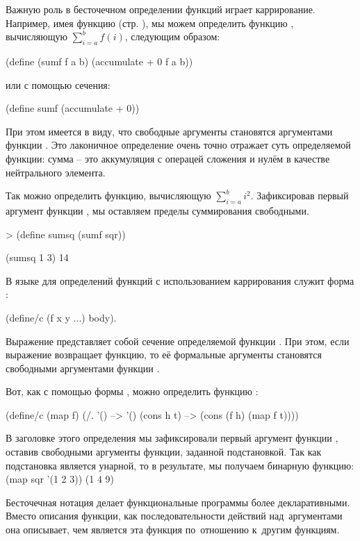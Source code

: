 Важную роль в бесточечном определении функций играет каррирование. Например, имея функцию  (стр. \pageref{accumulate}), мы можем определить функцию , вычисляющую $\sum_{i=a}^b f(i)$,  следующим образом:
\begin{SchemeCode}[emph={f,a,b}]
  (define (sumf f a b) (accumulate + 0 f a b))
\end{SchemeCode}
или с помощью сечения:
\begin{SchemeCode}
  (define sumf (accumulate + 0))
\end{SchemeCode}
При этом имеется в виду, что свободные аргументы  становятся аргументами функции . Это лаконичное определение очень точно отражает суть определяемой функции: сумма -- это аккумуляция с операцей сложения и нулём в качестве нейтрального элемента.

Так можно определить функцию, вычисляющую $\sum_{i=a}^b i^2$. Зафиксировав первый аргумент функции , мы оставляем пределы суммирования свободными.
\begin{SchemeCode}
   > (define sumsq (sumf sqr))
\end{SchemeCode}
\REPL
  {(sumsq 1 3)}
  {14} 

В языке \Scheme для определений функций с использованием каррирования служит форма :\label{define-c} 
\begin{SchemeCode}
(define/c (f x y ...) body).
\end{SchemeCode}
Выражение  представляет собой сечение определяемой функции . При этом, если выражение  возвращает функцию, то её формальные аргументы становятся свободными аргументами функции .

Вот, как с помощью формы , можно определить функцию :
\begin{SchemeCode}[emph={f,h,t}]
(define/c (map f)
  (/. '() --> '()
      (cons h t) --> (cons (f h) (map f t))))
\end{SchemeCode}
В заголовке этого определения мы зафиксировали первый аргумент функции , оставив свободными аргументы функции, заданной подстановкой. Так как подстановка является унарной, то в результате, мы получаем бинарную функцию:
\REPL
  {(map sqr '(1 2 3))}
  {(1 4 9)} 

Бесточечная нотация делает функциональные программы более декларативными. Вместо описания функции, как последовательности действий над~аргументами она описывает, чем является эта функция по~отношению к~другим функциям.

